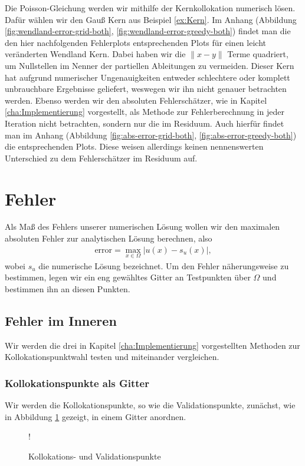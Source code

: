 Die Poisson-Gleichung werden wir mithilfe der Kernkollokation numerisch lösen. Dafür wählen wir den Gauß Kern aus Beispiel \ref{ex:Kern}. Im Anhang (Abbildung \ref{fig:wendland-error-grid-both}, \ref{fig:wendland-error-greedy-both}) findet man die den hier nachfolgenden Fehlerplots entsprechenden Plots für einen leicht veränderten Wendland Kern. Dabei haben wir die $\|x-y\|$ Terme quadriert, um Nullstellen im Nenner der partiellen Ableitungen zu vermeiden. Dieser Kern hat aufgrund numerischer Ungenauigkeiten entweder schlechtere oder komplett unbrauchbare Ergebnisse geliefert, weswegen wir ihn nicht genauer betrachten werden. Ebenso werden wir den absoluten Fehlerschätzer, wie in Kapitel \ref{cha:Implementierung} vorgestellt, als Methode zur Fehlerberechnung in jeder Iteration nicht betrachten, sondern nur die im Residuum. Auch hierfür findet man im Anhang (Abbildung \ref{fig:abs-error-grid-both}, \ref{fig:abs-error-greedy-both}) die entsprechenden Plots. Diese weisen allerdings keinen nennenswerten Unterschied zu dem Fehlerschätzer im Residuum auf.

\section{Fehler}

Als Maß des Fehlers unserer numerischen Lösung wollen wir den maximalen absoluten Fehler zur analytischen Lösung berechnen, also
\begin{align*}
\text{error} = \max_{x \in \Omega} |u(x) - s_u (x)|,
\end{align*}
wobei $s_u$ die numerische Lösung bezeichnet. Um den Fehler näherungsweise zu bestimmen, legen wir ein eng gewähltes Gitter an Testpunkten über $\Omega$ und bestimmen ihn an diesen Punkten.
\subsection{Fehler im Inneren}

Wir werden die drei in Kapitel \ref{cha:Implementierung} vorgestellten Methoden zur Kollokationspunktwahl testen und miteinander vergleichen. 

\subsubsection{Kollokationspunkte als Gitter}
Wir werden die Kollokationspunkte, so wie die Validationspunkte, zunächst, wie in Abbildung \ref{fig:Kollok} gezeigt, in einem Gitter anordnen.
\begin{figure}[ht]
\centering
\resizebox {.6\columnwidth} {!} {

}
\caption{Kollokations- und Validationspunkte}
\label{fig:Kollok}
\end{figure}

